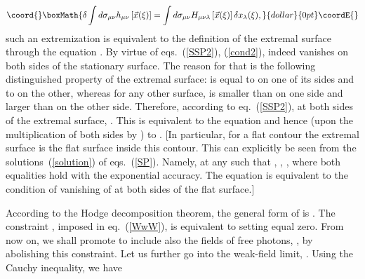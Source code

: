 \documentclass[a4paper,12pt]{article}
\begin{document}
$$\coord{}\boxMath{
\delta\int d\sigma_{\mu\nu}h_{\mu\nu}\left[\vec x(\xi)\right]=\int d\sigma_{\mu\nu}H_{\mu\nu\lambda}\left[\vec x(\xi)\right]\delta x_\lambda(\xi),
}{dollar}{0pt}\coordE{}$$
such an extremization is equivalent to the definition of the extremal surface through the equation
\coordHE{}. By virtue of eqs.~(\ref{SSP2}), (\ref{cond2}), \coordHE{}
indeed vanishes on both sides of the stationary surface. The reason for that is the following
distinguished property of the extremal surface:
\myHighlight{$\psi$}\coordHE{} is equal to \myHighlight{$\pi$}\coordHE{} on one of its sides and to \myHighlight{$-\pi$}\coordHE{} on the other, whereas for any other surface,
\myHighlight{$|\psi|$}\coordHE{} is smaller than \myHighlight{$\pi$}\coordHE{} on one side and larger than \myHighlight{$\pi$}\coordHE{} on the other side. Therefore,
according to eq.~(\ref{SSP2}), at both
sides of the extremal surface, \coordHE{}. This is
equivalent to the
equation \coordHE{} and hence (upon the multiplication of both sides by \coordHE{})
to \coordHE{}.
[In particular, for a flat contour the extremal surface is the flat surface inside this contour.
This can explicitly be seen from the solutions~(\ref{solution}) of eqs.~(\ref{SP}). Namely, at any \coordHE{} such that \coordHE{},
\coordHE{}, \coordHE{}, where both equalities hold with the exponential accuracy. The equation \coordHE{}
is equivalent to the condition of vanishing of \coordHE{} at both sides of the flat surface.]

According to the Hodge decomposition theorem, the general form of \coordHE{} is
\coordHE{}.
The constraint \coordHE{}, imposed in eq.~(\ref{WwW}), is equivalent to setting \coordHE{} equal zero.
From now on, we shall promote \coordHE{} to include also the fields of free photons, \coordHE{}, by abolishing this
constraint. Let us further go into the weak-field limit, \coordHE{}. Using the Cauchy inequality, we have
\end{document}
